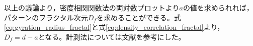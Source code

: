 \documentclass[autodetect-engine,dvi=dvipdfmx,a4paper,ja=standard,oneside,openany,11pt,draft]{bxjsbook}
\begin{document}
以上の議論より，密度相関関数法の両対数プロットより$a$の値を求められれば，パターンのフラクタル次元$D_f$を求めることができる。式\ref{eq:gyration_radius_fractal}と式\ref{eq:density_correlation_fractal}より，$D_f=d-a$となる。計測法については文献\cite{フラクタルの物理Ⅰ}を参考にした。


\ifdraft{
  
  
}{}
\end{document}

